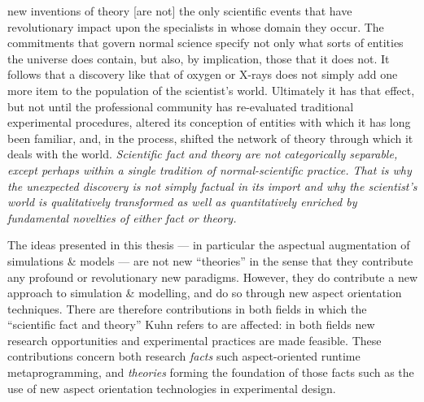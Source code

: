 \begin{displayquote}
   \textelp{}new inventions of theory [are not] the only scientific events that
   have revolutionary impact upon the specialists in whose domain they occur.
   The commitments that govern normal science specify not only what sorts of
   entities the universe does contain, but also, by implication, those that it
   does not. It follows \textelp{} that a discovery like that of oxygen or
   X-rays does not simply add one more item to the population of the scientist's
   world. Ultimately it has that effect, but not until the professional
   community has re-evaluated traditional experimental procedures, altered its
   conception of entities with which it has long been familiar, and, in the
   process, shifted the network of theory through which it deals with the world.
   \emph{Scientific fact and theory are not categorically separable, except perhaps
   within a single tradition of normal-scientific practice. That is why the
   unexpected discovery is not simply factual in its import and why the
   scientist's world is qualitatively transformed as well as quantitatively
   enriched by fundamental novelties of either fact or theory.}
\end{displayquote}

The ideas presented in this thesis --- in particular the aspectual augmentation
of simulations \& models --- are not new ``theories'' in the sense that they
contribute any profound or revolutionary new paradigms. However, they do
contribute a new approach to simulation \& modelling, and do so through new
aspect orientation techniques. There are therefore contributions in both fields
in which the ``scientific fact and theory'' Kuhn refers to are affected: in both
fields new research opportunities and experimental practices are made feasible.
These contributions concern both research \emph{facts} such aspect-oriented
runtime metaprogramming, and \emph{theories} forming the foundation of those
facts such as the use of new aspect orientation technologies in experimental
design.

